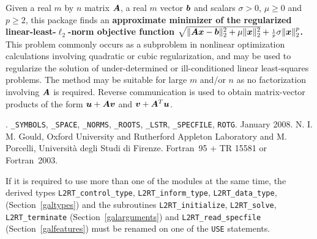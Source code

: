 \documentclass{galahad}
\newcommand{\packagename}{L2\-RT}
\newcommand{\fullpackagename}{\libraryname\_\packagename}
\begin{document}
\galheader


\galsummary
Given a real $m$ by $n$ matrix ${\bm{A}}$,
a real $m$ vector ${\bm{b}}$ and scalars $\sigma>0$, $\mu \geq 0$ and $p \geq 2$,
this package finds an
{\bf approximate minimizer of the regularized linear-least-$\ell_2$-norm
objective function
$\sqrt{\| {\bm{A}} {\bm{x}} - {\bm{b}}\|_2^2 + \mu \| {\bm{x}} \|_2^2}
 + {\scriptstyle \frac{1}{p}} \sigma \| {\bm{x}} \|_2^p$.}
This problem commonly occurs as a subproblem in nonlinear
optimization calculations involving quadratic or cubic regularization,
and may be used to regularize the solution
of under-determined or ill-conditioned linear least-squares problems.
The method may be suitable for large $m$ and/or $n$ as no factorization
involving ${\bm{A}}$ is required. Reverse communication is used to obtain
matrix-vector products of the form ${\bm{u}} + {\bm{A}} {\bm{v}}$ and
${\bm{v}} + {\bm{A}}^T {\bm{u}}$.


\galattributes
\galversions{\tt  \fullpackagename\_single, \fullpackagename\_double}.
\galuses
{\tt \libraryname\_SY\-M\-BOLS},
{\tt \libraryname\_SPACE}, {\tt \libraryname\_\-NORMS},
{\tt \libraryname\_ROOTS}, {\tt \libraryname\_LSTR},
{\tt \libraryname\_SPECFILE},
{\tt *ROTG}.
\galdate January 2008.
\galorigin N. I. M. Gould, Oxford University and Rutherford Appleton Laboratory
 and M. Porcelli, Universit\`{a} degli Studi di Firenze.
\gallanguage Fortran~95 + TR 15581 or Fortran~2003.


\galhowto



\noindent
If it is required to use more than one of the modules at the same time, 
the derived types
{\tt \packagename\_control\_type}, {\tt \packagename\_inform\_type},
{\tt \packagename\_data\_type},
(Section~\ref{galtypes})
and the subroutines
{\tt \packagename\_initialize},
{\tt \packagename\_solve}, {\tt \packagename\_terminate}
(Section~\ref{galarguments})
and
{\tt \packagename\_read\_specfile}
(Section~\ref{galfeatures})
must be renamed on one of the {\tt USE} statements.




\end{document}
